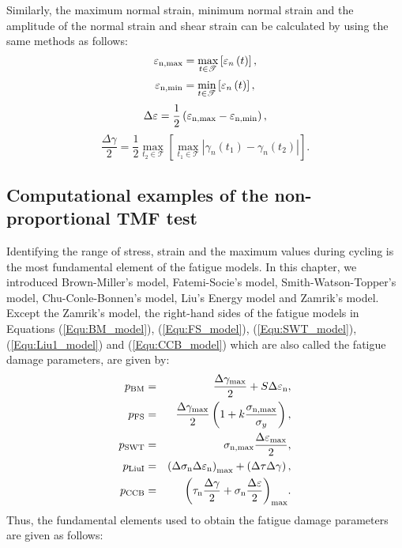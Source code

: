 Similarly, the maximum normal strain, minimum normal strain and the amplitude of the normal strain and shear strain can be calculated by using the same methods as follows:
\begin{equation}
{\varepsilon _{{\rm{n,max}}}} = \mathop {\max }\limits_{t \in \mathscr{T}} \left[ {{\varepsilon _n}\left( t \right)} \right],
\end{equation}
\begin{equation}
{\varepsilon _{{\rm{n,min}}}} = \mathop {\min }\limits_{t \in \mathscr{T}} \left[ {{\varepsilon _n}\left( t \right)} \right],
\end{equation}
\begin{equation}
\Delta \varepsilon  = \frac{1}{2}\left( {{\varepsilon _{{\rm{n,max}}}} - {\varepsilon _{{\rm{n,min}}}}} \right),
\end{equation}
\begin{equation}
\frac{{\Delta \gamma }}{2} = \frac{1}{2}\mathop {\max }\limits_{{t_2} \in \mathscr{T}} \left[ {\mathop {\max }\limits_{{t_1} \in \mathscr{T}} \left| {{\gamma _n}\left( {{t_1}} \right) - {\gamma _n}\left( {{t_2}} \right)} \right|} \right].
\label{Equ:delta_gamma}
\end{equation}

\subsection{Computational examples of the non-proportional TMF test}
\noindent
Identifying the range of stress, strain and the maximum values during cycling is the most fundamental element of the fatigue models.
In this chapter, we introduced Brown-Miller's model, Fatemi-Socie's model, Smith-Watson-Topper's model, Chu-Conle-Bonnen's model, Liu's Energy model and Zamrik's model.
Except the Zamrik's model, the right-hand sides of the fatigue models in Equations (\ref{Equ:BM_model}), (\ref{Equ:FS_model}), (\ref{Equ:SWT_model}), (\ref{Equ:Liu1_model}) and (\ref{Equ:CCB_model}) which are also called the fatigue damage parameters, are given by:
\begin{eqnarray*}
p_{\rm{BM}}&=&\frac{{\Delta {\gamma _{\max}}}}{2} + S\Delta {\varepsilon _{\rm n}}, \\
p_{\rm{FS}}&=&\frac{{\Delta {\gamma _{\max }}}}{2}\left( {1 + k\frac{{{\sigma _{\rm n,\max}}}}{{{\sigma _y}}}} \right), \\
p_{\rm{SWT}}&=&{\sigma _{\rm n, \max}}\frac{{\Delta \varepsilon_ {\max} }}{2}, \\
p_{\rm{LiuI}}&=&{\left( {\Delta {\sigma _{\rm n}}\Delta {\varepsilon _{\rm n}}} \right)_{\max }} + \left( {\Delta \tau \Delta \gamma } \right), \\
p_{\rm{CCB}}&=&{\left( {{\tau _{\rm n}}\frac{{\Delta \gamma }}{2} + {\sigma _{\rm n }}\frac{{\Delta \varepsilon }}{2}} \right)_{\max }}.
\end{eqnarray*}
Thus, the fundamental elements used to obtain the fatigue damage parameters are given as follows:

